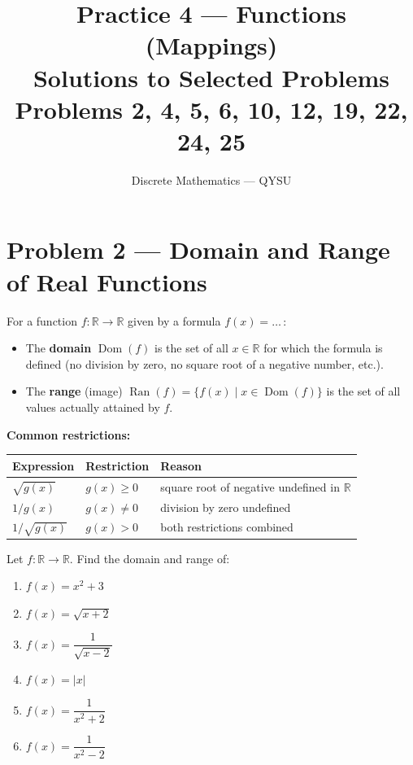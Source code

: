 \documentclass[12pt, a4paper]{article}
\title{\textbf{Practice 4 --- Functions (Mappings)}\\[4pt]
       \large Solutions to Selected Problems\\[2pt]
       \normalsize Problems 2, 4, 5, 6, 10, 12, 19, 22, 24, 25}
\author{Discrete Mathematics --- QYSU}
\date{}
\newcommand{\R}{\mathbb{R}}
\begin{document}
\maketitle
\tableofcontents
\newpage

\section{Problem 2 --- Domain and Range of Real Functions}

\begin{theorybox}
For a function $f : \R \to \R$ given by a formula $f(x) = \ldots$\,:
\begin{itemize}[nosep]
  \item The \textbf{domain} $\operatorname{Dom}(f)$ is the set of all $x \in \R$
        for which the formula is defined (no division by zero, no square root
        of a negative number, etc.).
  \item The \textbf{range} (image) $\operatorname{Ran}(f) = \{f(x) \mid x \in \operatorname{Dom}(f)\}$
        is the set of all values actually attained by $f$.
\end{itemize}

\medskip
\textbf{Common restrictions:}
\begin{center}
\renewcommand{\arraystretch}{1.3}
\begin{tabular}{lll}
\toprule
\textbf{Expression} & \textbf{Restriction} & \textbf{Reason} \\
\midrule
$\sqrt{g(x)}$ & $g(x) \ge 0$ & square root of negative undefined in $\R$ \\
$1/g(x)$ & $g(x) \neq 0$ & division by zero undefined \\
$1/\sqrt{g(x)}$ & $g(x) > 0$ & both restrictions combined \\
\bottomrule
\end{tabular}
\end{center}
\end{theorybox}

\begin{problembox}
Let $f : \R \to \R$. Find the domain and range of:
\begin{enumerate}[label=(\alph*), nosep]
  \item $f(x) = x^2 + 3$
  \item $f(x) = \sqrt{x+2}$
  \item $f(x) = \dfrac{1}{\sqrt{x-2}}$
  \item $f(x) = |x|$
  \item $f(x) = \dfrac{1}{x^2+2}$
  \item $f(x) = \dfrac{1}{x^2-2}$
\end{enumerate}
\end{problembox}
\end{document}
